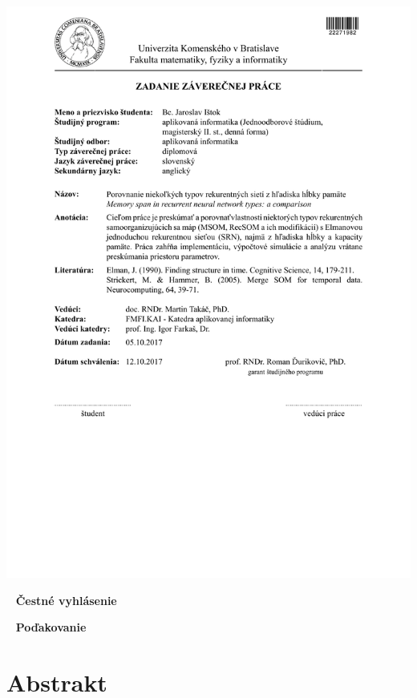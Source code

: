 \documentclass[12pt, oneside]{book}
\begin{document}
\newpage 
\thispagestyle{empty}
\hspace{-2cm}\includegraphics[width=1.1\textwidth]{assets/zadanie_master_thesis}



\frontmatter

\setcounter{page}{3}
\newpage 
~
\vfill
{\bf Čestné vyhlásenie }



\setcounter{page}{3}
\newpage 
~
\vfill
{\bf Poďakovanie }



\newpage 
\section*{Abstrakt}
\end{document}
